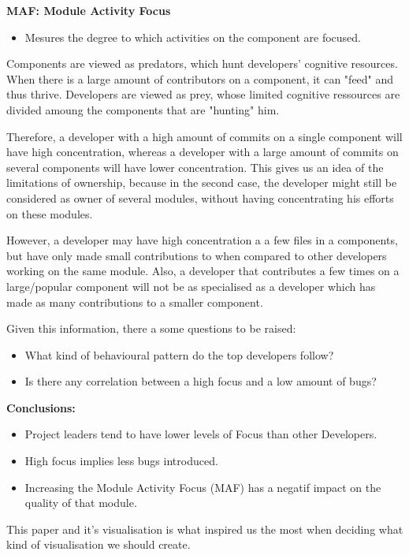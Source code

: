\textbf{MAF: Module Activity Focus}
\begin{itemize}
\item Mesures the degree to which activities on the component are focused.
\end{itemize}

Components are viewed as predators, which hunt developers' cognitive resources. When there is a large amount of contributors on a component, it can "feed" and thus thrive.
Developers are viewed as prey, whose limited cognitive ressources are divided amoung the components that are "hunting" him.

Therefore, a developer with a high amount of commits on a single component will have high concentration, whereas a developer with a large amount of commits on several components will have lower concentration.
This gives us an idea of the limitations of ownership, because in the second case, the developer might still be considered as owner of several modules, without having concentrating his efforts on these modules.

However, a developer may have high concentration a a few files in a components, but have only made small contributions to when compared to other developers working on the same module.
Also, a developer that contributes a few times on a large/popular component will not be as specialised as a developer which has made as many contributions to a smaller component.

Given this information, there a some questions to be raised:
\begin{itemize}
\item What kind of behavioural pattern do the top developers follow?
\item Is there any correlation between a high focus and a low amount of bugs?
\end{itemize}

\textbf{Conclusions:}
\begin{itemize}
\item Project leaders tend to have lower levels of Focus than other Developers.
\item High focus implies less bugs introduced.
\item Increasing the Module Activity Focus (MAF) has a negatif impact on the quality of that module.
\end{itemize}

This paper and it's visualisation is what inspired us the most when deciding what kind of visualisation we should create.